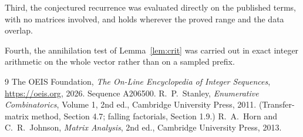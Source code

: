 \documentclass[11pt,a4paper]{article}
\theoremstyle{plain}
\theoremstyle{definition}
\begin{document}
Third, the conjectured recurrence was evaluated directly on the published terms, with no
matrices involved, and holds wherever the proved range and the data overlap.

Fourth, the annihilation test of Lemma~\ref{lem:crit} was carried out in exact integer
arithmetic on the whole vector rather than on a sampled prefix.

\begin{thebibliography}{9}
 The OEIS Foundation, \emph{The On-Line Encyclopedia of Integer
Sequences}, \url{https://oeis.org}, 2026. Sequence A206500.
 R.~P.~Stanley, \emph{Enumerative Combinatorics}, Volume 1, 2nd ed.,
Cambridge University Press, 2011. (Transfer-matrix method, Section 4.7; falling factorials,
Section 1.9.)
 R.~A.~Horn and C.~R.~Johnson, \emph{Matrix Analysis}, 2nd ed., Cambridge
University Press, 2013.
\end{thebibliography}
\end{document}
